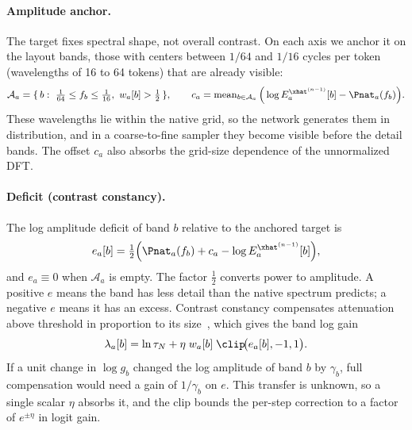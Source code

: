 \paragraph{Amplitude anchor.}
The target fixes spectral shape, not overall contrast. On each axis we anchor it on the layout bands, those with centers between $1/64$ and $1/16$ cycles per token (wavelengths of 16 to 64 tokens) that are already visible:
\begin{equation}
\mathcal A_a = \{\,b:\ \tfrac1{64}\le f_b\le\tfrac1{16},\ w_a[b]>\tfrac12\,\},\qquad
c_a = \operatorname{mean}_{b\in\mathcal A_a}\Big(\log E_a^{\xhat^{(n-1)}}[b] - \Pnat_a(f_b)\Big).
\label{eq:anchor}
\end{equation}
These wavelengths lie within the native grid, so the network generates them in distribution, and in a coarse-to-fine sampler they become visible before the detail bands. The offset $c_a$ also absorbs the grid-size dependence of the unnormalized DFT.

\paragraph{Deficit (contrast constancy).}
The log amplitude deficit of band $b$ relative to the anchored target is
\begin{equation}
e_a[b] = \tfrac12\Big(\Pnat_a(f_b) + c_a - \log E_a^{\xhat^{(n-1)}}[b]\Big),
\label{eq:deficit}
\end{equation}
and $e_a\equiv0$ when $\mathcal A_a$ is empty. The factor $\tfrac12$ converts power to amplitude. A positive $e$ means the band has less detail than the native spectrum predicts; a negative $e$ means it has an excess. Contrast constancy compensates attenuation above threshold in proportion to its size~\citep{georgeson1975contrast}, which gives the band log gain
\begin{equation}
\lambda_a[b] = \ln\tau_N + \eta\; w_a[b]\;\clip\!\big(e_a[b],-1,1\big).
\label{eq:lambda}
\end{equation}
If a unit change in $\log g_b$ changed the log amplitude of band $b$ by $\gamma_b$, full compensation would need a gain of $1/\gamma_b$ on $e$. This transfer is unknown, so a single scalar $\eta$ absorbs it, and the clip bounds the per-step correction to a factor of $e^{\pm\eta}$ in logit gain.

